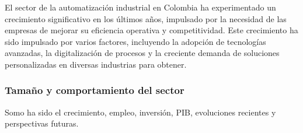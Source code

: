 El sector de la automatización industrial en Colombia ha experimentado un crecimiento significativo en los últimos años, impulsado por la necesidad de las empresas de mejorar su eficiencia operativa y competitividad. Este crecimiento ha sido impulsado por varios factores, incluyendo la adopción de tecnologías avanzadas, la digitalización de procesos y la creciente demanda de soluciones personalizadas en diversas industrias para obtener.

\subsubsection{Tamaño y comportamiento del sector}
Somo ha sido el crecimiento, empleo, inversión, PIB, evoluciones recientes y perspectivas futuras.
